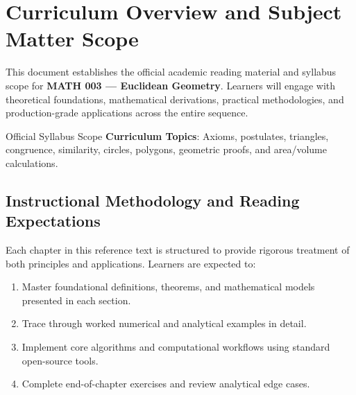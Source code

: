 \section{Curriculum Overview and Subject Matter Scope}

This document establishes the official academic reading material and syllabus scope for \textbf{MATH 003 --- Euclidean Geometry}. Learners will engage with theoretical foundations, mathematical derivations, practical methodologies, and production-grade applications across the entire sequence.

\begin{InsightBox}{Official Syllabus Scope}
  \textbf{Curriculum Topics}: Axioms, postulates, triangles, congruence, similarity, circles, polygons, geometric proofs, and area/volume calculations.
\end{InsightBox}

\subsection{Instructional Methodology and Reading Expectations}

Each chapter in this reference text is structured to provide rigorous treatment of both principles and applications. Learners are expected to:
\begin{enumerate}
  \item Master foundational definitions, theorems, and mathematical models presented in each section.
  \item Trace through worked numerical and analytical examples in detail.
  \item Implement core algorithms and computational workflows using standard open-source tools.
  \item Complete end-of-chapter exercises and review analytical edge cases.
\end{enumerate}

